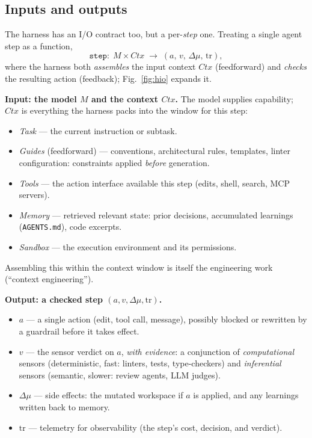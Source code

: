 \documentclass[10pt,twocolumn,letterpaper]{article}
\begin{document}
\subsection{Inputs and outputs}
\label{sec:harness-io}
The harness has an I/O contract too, but a per-\emph{step} one. Treating a single
agent step as a function,
\[
\texttt{step}:\; M \times \mathit{Ctx} \;\to\; (a,\, v,\, \Delta\mu,\, \mathrm{tr}),
\]
where the harness both \emph{assembles} the input context $\mathit{Ctx}$
(feedforward) and \emph{checks} the resulting action (feedback);
Fig.~\ref{fig:hio} expands it.

\noindent\textbf{Input: the model $M$ and the context $\mathit{Ctx}$.} The model
supplies capability; $\mathit{Ctx}$ is everything the harness packs into the
window for this step:
\begin{itemize}[leftmargin=1.2em,itemsep=1pt,topsep=2pt,parsep=0pt]
\item \emph{Task} --- the current instruction or subtask.
\item \emph{Guides} (feedforward) --- conventions, architectural rules,
templates, linter configuration: constraints applied \emph{before} generation.
\item \emph{Tools} --- the action interface available this step (edits, shell,
search, MCP servers).
\item \emph{Memory} --- retrieved relevant state: prior decisions, accumulated
learnings (\texttt{AGENTS.md}), code excerpts.
\item \emph{Sandbox} --- the execution environment and its permissions.
\end{itemize}
Assembling this within the context window is itself the engineering work
(``context engineering'').

\noindent\textbf{Output: a checked step $(a, v, \Delta\mu, \mathrm{tr})$.}
\begin{itemize}[leftmargin=1.2em,itemsep=1pt,topsep=2pt,parsep=0pt]
\item $a$ --- a single action (edit, tool call, message), possibly blocked or
rewritten by a guardrail before it takes effect.
\item $v$ --- the sensor verdict on $a$, \emph{with evidence}: a conjunction of
\emph{computational} sensors (deterministic, fast: linters, tests,
type-checkers) and \emph{inferential} sensors (semantic, slower: review agents,
LLM judges).
\item $\Delta\mu$ --- side effects: the mutated workspace if $a$ is applied, and
any learnings written back to memory.
\item $\mathrm{tr}$ --- telemetry for observability (the step's cost, decision,
and verdict).
\end{itemize}
\end{document}
